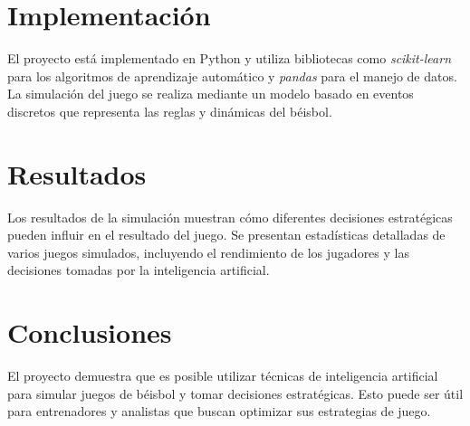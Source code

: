 \documentclass[runningheads]{llncs}
\begin{document}
\section{Implementación}
    El proyecto está implementado en Python y utiliza bibliotecas como \textit{scikit-learn} para los algoritmos de aprendizaje automático y \textit{pandas} para el manejo de datos. La simulación del juego se realiza mediante un modelo basado en eventos discretos que representa las reglas y dinámicas del béisbol.

\section{Resultados}
    Los resultados de la simulación muestran cómo diferentes decisiones estratégicas pueden influir en el resultado del juego. Se presentan estadísticas detalladas de varios juegos simulados, incluyendo el rendimiento de los jugadores y las decisiones tomadas por la inteligencia artificial.

\section{Conclusiones}
    El proyecto demuestra que es posible utilizar técnicas de inteligencia artificial para simular juegos de béisbol y tomar decisiones estratégicas. Esto puede ser útil para entrenadores y analistas que buscan optimizar sus estrategias de juego.





\end{document}
